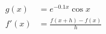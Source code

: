 \documentclass{article}
\begin{document}
\begin{equation}
\begin{split}
g(x) & = e^{-0.1x} \cos x\\
f'(x) &= \frac{f(x+h) - f(x)}{h}
\end{split}
\end{equation}
\end{document}

